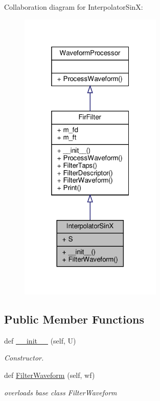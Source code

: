 Collaboration diagram for Interpolator\+SinX\+:
\nopagebreak
\begin{figure}[H]
\begin{center}
\leavevmode
\includegraphics[width=193pt]{classSignalIntegrity_1_1TimeDomain_1_1Filters_1_1InterpolatorSinX_1_1InterpolatorSinX__coll__graph}
\end{center}
\end{figure}
\subsection*{Public Member Functions}
\begin{DoxyCompactItemize}
\item 
def \hyperlink{classSignalIntegrity_1_1TimeDomain_1_1Filters_1_1InterpolatorSinX_1_1InterpolatorSinX_abff7619574bd23d3249b999fcc5bc87b}{\+\_\+\+\_\+init\+\_\+\+\_\+} (self, U)
\begin{DoxyCompactList}\small\item\em Constructor. \end{DoxyCompactList}\item 
def \hyperlink{classSignalIntegrity_1_1TimeDomain_1_1Filters_1_1InterpolatorSinX_1_1InterpolatorSinX_a84e73c18250ca4a61482f94ad61e735b}{Filter\+Waveform} (self, wf)
\begin{DoxyCompactList}\small\item\em overloads base class Filter\+Waveform \end{DoxyCompactList}\end{DoxyCompactItemize}


